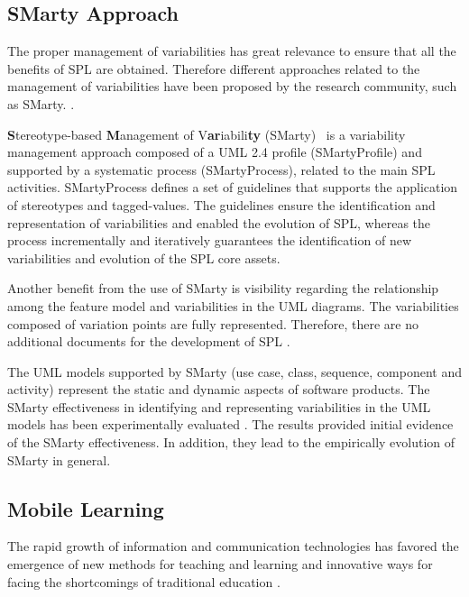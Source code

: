 \subsection{SMarty Approach}


The proper management of variabilities has great relevance to ensure that all the benefits of SPL are obtained. Therefore different approaches related to the management of variabilities have been proposed by the research community, such as SMarty.  \cite{chen11,capilla13}.  

\textbf{S}tereotype-based \textbf{M}anagement of V\textbf{ar}iabili\textbf{ty} (SMarty)~\cite{oliveirajr10} is a variability management approach composed of a UML 2.4 profile (SMartyProfile) and supported by a systematic process (SMartyProcess), related to the main SPL activities. SMartyProcess defines a set of guidelines that supports the application of stereotypes and tagged-values. The guidelines ensure the identification and representation of variabilities and enabled the evolution of SPL, whereas the process incrementally and iteratively guarantees the identification of new variabilities and evolution of the SPL core assets.

Another benefit from the use of SMarty is visibility regarding the relationship among the feature model and variabilities in the UML diagrams. The variabilities composed of variation points are fully represented. Therefore, there are no additional documents for the development of SPL \cite{oliveirajr10}.

The UML models supported by SMarty (use case, class, sequence, component and activity) represent the static and dynamic aspects of software products. The SMarty effectiveness in identifying and representing variabilities in the UML models has been experimentally evaluated \cite{marcolino13,marcolino14a,marcolino14b,bera15}. The results provided initial evidence of the SMarty effectiveness. In addition, they lead to the empirically evolution of SMarty in general.

\subsection{Mobile Learning}

The rapid growth of information and communication technologies has favored the emergence of new methods for teaching and learning and innovative ways for facing the shortcomings of traditional education \cite{west12}. 

